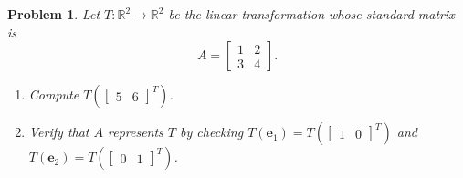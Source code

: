 \documentclass[11pt,openany]{article}
\newtheorem{problem}{Problem}
\renewcommand{\vec}[1]{\mathbf{#1}}
\begin{document}
\newpage
\begin{problem}
	Let $T:\mathbb{R}^2\to\mathbb{R}^2$ be the linear transformation whose standard matrix is
	\[
	A = \begin{bmatrix}
		1 & 2\\
		3 & 4
	\end{bmatrix}.
	\]
	\begin{enumerate}
		\item Compute $T\left(\begin{bmatrix}5 &6\end{bmatrix}^T\right)$.
		\item Verify that $A$ represents $T$ by checking $T(\vec{e}_1)=T\left(\begin{bmatrix}1 &0\end{bmatrix}^T\right)$ and $T(\vec{e}_2)=T\left(\begin{bmatrix}0 &1\end{bmatrix}^T\right)$.
	\end{enumerate}
\end{problem}
\end{document}
